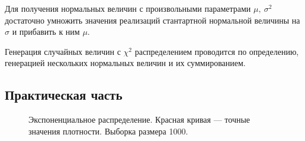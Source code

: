 \documentclass[12pt, a4paper]{article}
\begin{document}
Для получения нормальных величин с произвольными параметрами $\mu,\ \sigma^2$ достаточно умножить значения реализаций стантартной нормальной величины на $\sigma$ и прибавить к ним $\mu$.

Генерация случайных величин с $\chi^2$ распределением проводится по определению, генерацией нескольких нормальных величин и их суммированием.

\subsection{Практическая часть}
\begin{figure}[H]
\caption{Экспоненциальное распределение. Красная кривая --- точные значения плотности. Выборка размера 1000.}
\end{figure}
\end{document}
